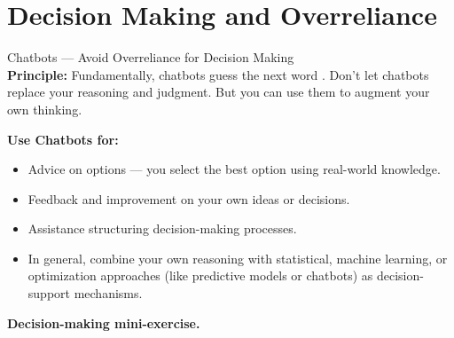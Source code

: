 \documentclass[aspectratio=169]{beamer}
\begin{document}
\section{Decision Making and Overreliance}

\begin{frame}[t]{Chatbots — Avoid Overreliance for Decision Making\\
\small{\parencite{TowardsaStandardforI537, ArtificialIntelligen058}}}
\textbf{Principle:} Fundamentally, chatbots guess the next word \parencite{hicks2024chatgpt}. Don’t let chatbots replace your reasoning and judgment. But you can use them to augment your own thinking.

\vspace{1em}

\textbf{Use Chatbots for:}
\begin{itemize}
    \item Advice on options — you select the best option using real-world knowledge.
    \item Feedback and improvement on your own ideas or decisions.
    \item Assistance structuring decision-making processes.
    \item In general, combine your own reasoning with statistical, machine learning, or optimization approaches (like predictive models or chatbots) as decision-support mechanisms. 
\end{itemize}

\vspace{1em}

\textbf{Decision-making mini-exercise.} 

\end{frame}
\end{document}
